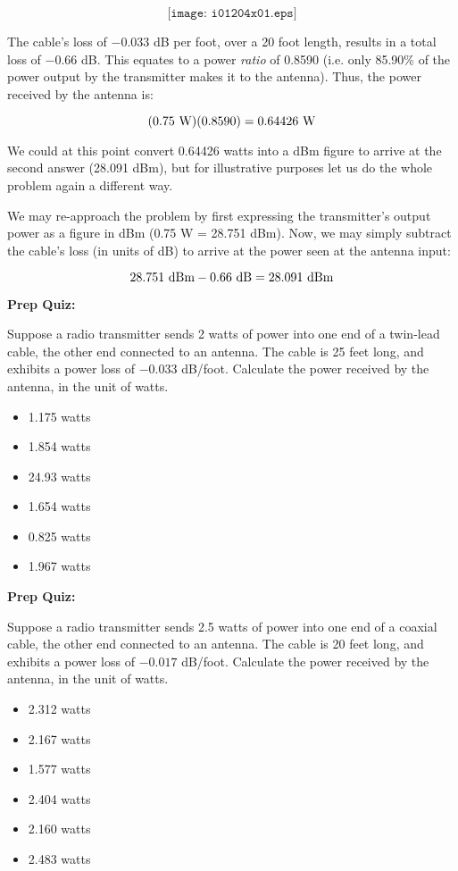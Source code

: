 $$\texttt{[image: i01204x01.eps]}$$

The cable's loss of $-0.033$ dB per foot, over a 20 foot length, results in a total loss of $-0.66$ dB.  This equates to a power {\it ratio} of 0.8590 (i.e. only 85.90\% of the power output by the transmitter makes it to the antenna).  Thus, the power received by the antenna is:

$$(0.75 \hbox{ W})(0.8590) = 0.64426 \hbox{ W}$$

We could at this point convert 0.64426 watts into a dBm figure to arrive at the second answer (28.091 dBm), but for illustrative purposes let us do the whole problem again a different way.

\vskip 10pt

We may re-approach the problem by first expressing the transmitter's output power as a figure in dBm (0.75 W = 28.751 dBm).  Now, we may simply subtract the cable's loss (in units of dB) to arrive at the power seen at the antenna input:

$$28.751 \hbox{ dBm} - 0.66 \hbox{ dB} = 28.091 \hbox{ dBm}$$


\vfil \eject

\noindent
{\bf Prep Quiz:}

Suppose a radio transmitter sends 2 watts of power into one end of a twin-lead cable, the other end connected to an antenna.  The cable is 25 feet long, and exhibits a power loss of $-0.033$ dB/foot.  Calculate the power received by the antenna, in the unit of watts.

\begin{itemize}
\item{} 1.175 watts
\vskip 5pt 
\item{} 1.854 watts
\vskip 5pt 
\item{} 24.93 watts
\vskip 5pt 
\item{} 1.654 watts
\vskip 5pt 
\item{} 0.825 watts
\vskip 5pt 
\item{} 1.967 watts
\end{itemize}


\vfil \eject

\noindent
{\bf Prep Quiz:}

Suppose a radio transmitter sends 2.5 watts of power into one end of a coaxial cable, the other end connected to an antenna.  The cable is 20 feet long, and exhibits a power loss of $-0.017$ dB/foot.  Calculate the power received by the antenna, in the unit of watts.

\begin{itemize}
\item{} 2.312 watts
\vskip 5pt 
\item{} 2.167 watts
\vskip 5pt 
\item{} 1.577 watts
\vskip 5pt 
\item{} 2.404 watts
\vskip 5pt 
\item{} 2.160 watts
\vskip 5pt 
\item{} 2.483 watts
\end{itemize}





